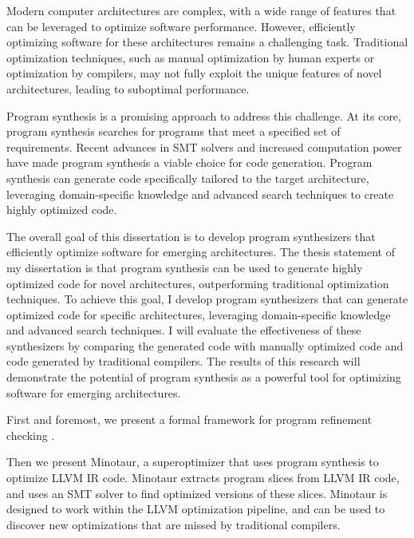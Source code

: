 

Modern computer architectures are complex, with a wide range of
features that can be leveraged to optimize software performance.
However, efficiently optimizing software for these architectures
remains a challenging task. Traditional optimization techniques,
such as manual optimization by human experts or optimization by
compilers, may not fully exploit the unique features of novel
architectures, leading to suboptimal performance.

Program synthesis is a promising approach to address this challenge.
At its core, program synthesis searches for programs that meet a
specified set of requirements. Recent advances in SMT solvers and
increased computation power have made program synthesis a viable
choice for code generation. Program synthesis can generate code
specifically tailored to the target architecture, leveraging
domain-specific knowledge and advanced search techniques to create
highly optimized code.

The overall goal of this dissertation is to develop program
synthesizers that efficiently optimize software for emerging
architectures. The thesis statement of my dissertation is that program
synthesis can be used to generate highly optimized code for novel
architectures, outperforming traditional optimization techniques. To
achieve this goal, I develop program synthesizers that can
generate optimized code for specific architectures, leveraging
domain-specific knowledge and advanced search techniques. I will
evaluate the effectiveness of these synthesizers by comparing the
generated code with manually optimized code and code generated by
traditional compilers. The results of this research will demonstrate
the potential of program synthesis as a powerful tool for optimizing
software for emerging architectures.

First and foremost, we present a formal framework for program refinement
checking .

Then we present Minotaur, a superoptimizer that uses program synthesis
to optimize LLVM IR code. Minotaur extracts program slices from LLVM IR
code, and uses an SMT solver to find optimized versions of these slices.
Minotaur is designed to work within the LLVM optimization pipeline, and
can be used to discover new optimizations that are missed by traditional
compilers.

